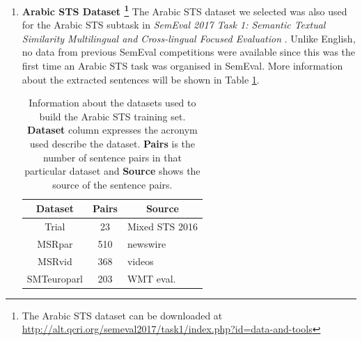   
\begin{enumerate}
\item{ \textbf{Arabic STS Dataset \footnote{The Arabic STS dataset can be downloaded at \url{http://alt.qcri.org/semeval2017/task1/index.php?id=data-and-tools}}}} The Arabic STS dataset we selected was also used for the Arabic STS subtask in \textit{SemEval 2017 Task 1: Semantic Textual Similarity Multilingual and Cross-lingual Focused Evaluation} \autocite{cer-etal-2017-semeval}. Unlike English, no data from previous SemEval competitions were available since this was the first time an Arabic STS task was organised in SemEval. More information about the extracted sentences will be shown in Table \ref{tab:arabicdata_info}. 

\begin{table}[ht!]
	\centering
	\begin{tabular}{c|c|l}
		\hline
		\multicolumn{1}{c|}{\textbf{Dataset}} & 
		\multicolumn{1}{c|}{\textbf{Pairs}} & 
		\multicolumn{1}{c}{\textbf{Source}} \\
		\hline
		Trial & 23 & Mixed STS 2016 \\
		MSRpar  & 510 & newswire \\
		MSRvid  & 368 & videos \\
		SMTeuroparl  & 203 & WMT eval. \\
		\hline
	\end{tabular}
	\caption[Information about Arabic STS training set]{Information about the datasets used to build the Arabic STS training set. \textbf{Dataset} column expresses the acronym used describe the dataset. \textbf{Pairs} is the number of sentence pairs in that particular dataset and \textbf{Source} shows the source of the sentence pairs. }
	\label{tab:arabicdata_info}
\end{table} 


\end{enumerate}
